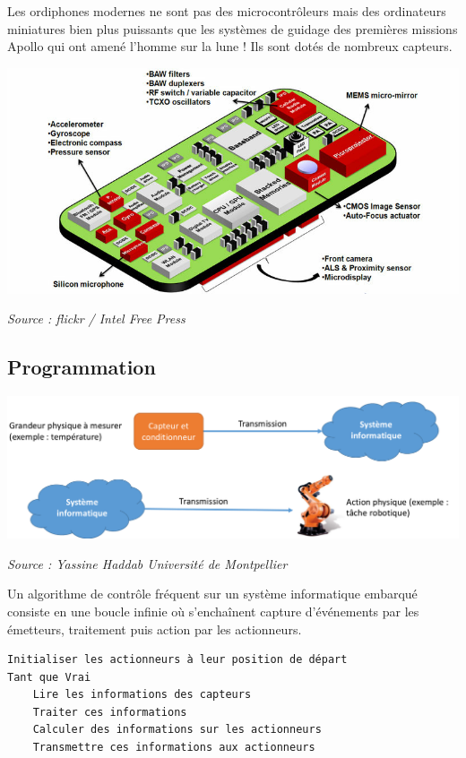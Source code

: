 Les ordiphones modernes  ne sont pas des microcontrôleurs mais des ordinateurs miniatures bien plus puissants que  les systèmes de guidage des premières missions Apollo qui ont amené l'homme sur la lune !  Ils sont dotés de nombreux capteurs.


\begin{center}
\includegraphics[scale=0.5]{smartphone.png}

{\itshape Source :  flickr / Intel Free Press }
\end{center}



\subsection{Programmation}


\begin{center}
\includegraphics[scale=0.4]{systeme_embarque.png}

{\itshape \small Source : Yassine Haddab Université de Montpellier}
\end{center}


\begin{methode}{}
Un algorithme de contrôle  fréquent sur un système informatique embarqué consiste en une boucle infinie où s'enchaînent capture d'événements par les émetteurs, traitement puis action par les actionneurs.  
\begin{lstlisting}[style=compil]
Initialiser les actionneurs à leur position de départ
Tant que Vrai 
	Lire les informations des capteurs
	Traiter ces informations
	Calculer des informations sur les actionneurs
	Transmettre ces informations aux actionneurs
\end{lstlisting}

\end{methode}



